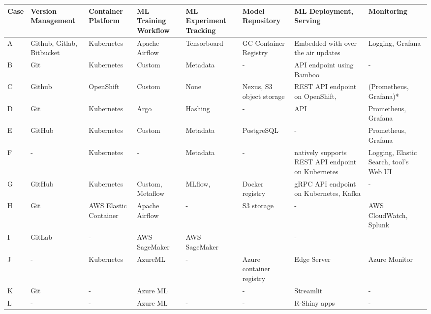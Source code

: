 \begin{table*}[ht]
{\begin{tabular}{lp{}p{}p{2cm}p{2cm}p{}p{}p{2cm}}
         \textbf{Case} &\textbf{Version Management}& \textbf{Container Platform}& \textbf{ML Training Workflow} & \textbf{ML Experiment Tracking}& \textbf{Model Repository} & \textbf{ML Deployment, Serving}& \textbf{Monitoring}\\
         \toprule
         A & Github, Gitlab, Bitbucket & Kubernetes & Apache Airflow & Tensorboard  &  GC Container Registry & Embedded with over the air updates & Logging, Grafana
         \\ \hline

         B & Git & Kubernetes & Custom & Metadata  & - & API endpoint using Bamboo & -
         \\ \hline

         C & Github & OpenShift & Custom & None & Nexus, S3 object storage &  REST API endpoint on OpenShift, & (Prometheus, Grafana)*
          \\ \hline

         D & Git & Kubernetes & Argo & Hashing & -& API & Prometheus, Grafana
          \\ \hline

         E & GitHub & Kubernetes & Custom & Metadata  & PostgreSQL &- & Prometheus, Grafana
          \\  \hline

         F & - & Kubernetes & -& Metadata & -& natively supports REST API endpoint on Kubernetes & Logging, Elastic Search, tool's Web UI
          \\  \hline

         G & GitHub & Kubernetes & Custom, Metaflow & MLflow,  & Docker registry & gRPC API endpoint on Kubernetes, Kafka & -
          \\  \hline

         H & Git & AWS Elastic Container & Apache Airflow & -& S3 storage & - & AWS CloudWatch, Splunk
          \\  \hline

         I & GitLab & - & AWS SageMaker & AWS SageMaker & & -
          \\  \hline

         J & - & Kubernetes & AzureML & - & Azure container registry & Edge Server& Azure Monitor
          \\  \hline

         K & Git & -& Azure ML & & - & Streamlit & -
          \\  \hline

         L & -& -& Azure ML & - & - & R-Shiny apps & -
          \\  \hline


\end{tabular}}
\end{table*}
